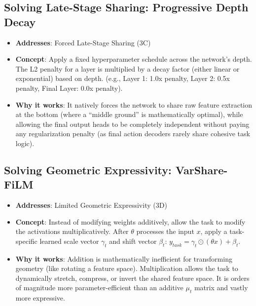 \documentclass[11pt,a4paper]{article}
\begin{document}
\subsection{Solving Late-Stage Sharing: Progressive Depth Decay}
\begin{itemize}
    \item \textbf{Addresses}: Forced Late-Stage Sharing (3C)
    \item \textbf{Concept}: Apply a fixed hyperparameter schedule across the network's depth. The L2 penalty for a layer is multiplied by a decay factor (either linear or exponential) based on depth. (e.g., Layer 1: 1.0x penalty, Layer 2: 0.5x penalty, Final Layer: 0.0x penalty).
    \item \textbf{Why it works}: It natively forces the network to share raw feature extraction at the bottom (where a ``middle ground'' is mathematically optimal), while allowing the final output heads to be completely independent without paying any regularization penalty (as final action decoders rarely share cohesive task logic).
\end{itemize}

\subsection{Solving Geometric Expressivity: VarShare-FiLM}
\begin{itemize}
    \item \textbf{Addresses}: Limited Geometric Expressivity (3D)
    \item \textbf{Concept}: Instead of modifying weights additively, allow the task to modify the activations multiplicatively. After $\theta$ processes the input $x$, apply a task-specific learned scale vector $\gamma_t$ and shift vector $\beta_t$: $y_{task} = \gamma_t \odot (\theta x) + \beta_t$.
    \item \textbf{Why it works}: Addition is mathematically inefficient for transforming geometry (like rotating a feature space). Multiplication allows the task to dynamically stretch, compress, or invert the shared feature space. It is orders of magnitude more parameter-efficient than an additive $\mu_t$ matrix and vastly more expressive.
\end{itemize}
\end{document}
